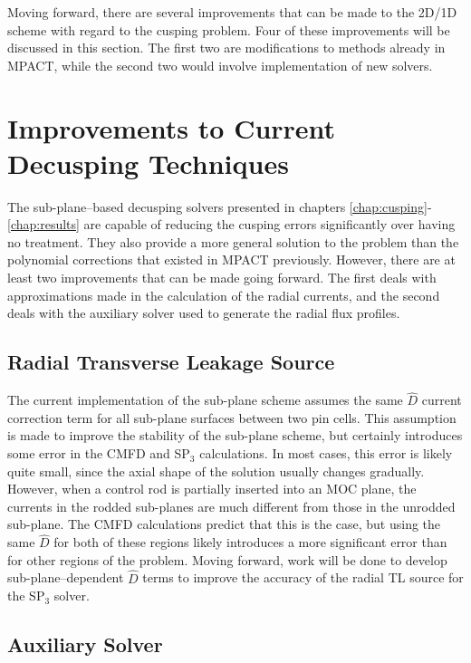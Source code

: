Moving forward, there are several improvements that can be made to the 2D/1D scheme with regard to the cusping problem.  Four of these improvements will be discussed in this section.  The first two are modifications to methods already in MPACT, while the second two would involve implementation of new solvers.

\section{Improvements to Current Decusping Techniques}

The sub-plane--based decusping solvers presented in chapters \ref{chap:cusping}-\ref{chap:results} are capable of reducing the cusping errors significantly over having no treatment.  They also provide a more general solution to the problem than the polynomial corrections that existed in MPACT previously.  However, there are at least two improvements that can be made going forward.  The first deals with approximations made in the calculation of the radial currents, and the second deals with the auxiliary solver used to generate the radial flux profiles.

\subsection{Radial Transverse Leakage Source}

The current implementation of the sub-plane scheme assumes the same $\hat{D}$ current correction term for all sub-plane surfaces between two pin cells.  This assumption is made to improve the stability of the sub-plane scheme, but certainly introduces some error in the CMFD and SP$_3$ calculations.  In most cases, this error is likely quite small, since the axial shape of the solution usually changes gradually.  However, when a control rod is partially inserted into an MOC plane, the currents in the rodded sub-planes are much different from those in the unrodded sub-plane.  The CMFD calculations predict that this is the case, but using the same $\hat{D}$ for both of these regions likely introduces a more significant error than for other regions of the problem.  Moving forward, work will be done to develop sub-plane--dependent $\hat{D}$ terms to improve the accuracy of the radial TL source for the SP$_3$ solver.

\subsection{Auxiliary Solver}

